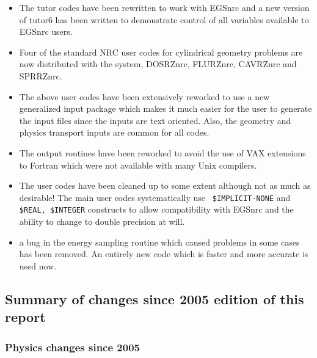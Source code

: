 \begin{itemize} 
\item The tutor codes have been rewritten to work with EGSnrc and a new
version of tutor6 has been written to demonstrate control of all variables
available to EGSnrc users.

\item Four of the standard NRC user codes for cylindrical geometry problems
 are now distributed with the system, DOSRZnrc, FLURZnrc, CAVRZnrc and
SPRRZnrc.

\item The above user codes have been extensively reworked to use a
new generalized input package which makes it much easier for the user
to generate the input files since the inputs are text oriented. Also,
the geometry and physics transport inputs are common for all codes.

\item The output routines have been reworked to avoid the use of
VAX extensions to Fortran which were not available with many Unix compilers.

\item The user codes have been cleaned up to some extent although not as
much as desirable! The main user codes systematically use {\tt
\$IMPLICIT-NONE}
and {\tt \$REAL, \$INTEGER} constructs to allow compatibility with EGSnrc and
the ability to change to double precision at will.

\item a bug in the energy sampling routine which caused problems in some
cases has been removed. An entirely new code which is faster and more
accurate is used now.
\end{itemize} 

\subsection{Summary of changes since 2005 edition of this report}

\subsubsection{Physics changes since 2005} 

